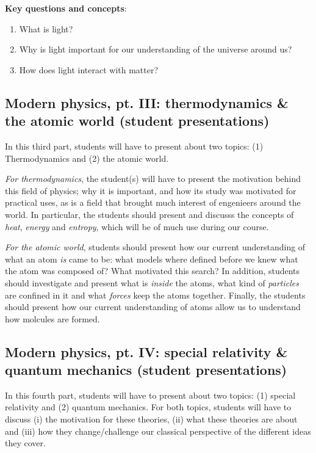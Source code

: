 \documentclass{tufte-handout}
\begin{document}
\begin{fullwidth}
\vspace{0.5 cm}
\noindent \textbf{Key questions and concepts}:
\begin{enumerate}
\item What is light?
\item Why is light important for our understanding of the universe around us?
\item How does light interact with matter?
\end{enumerate}

\subsection{Modern physics, pt. III: thermodynamics \& the atomic world (student presentations)}
In this third part, students will have to present about two topics: (1) Thermodynamics and (2) the atomic world.

\textit{For thermodynamics}, the student(s) will have to present the motivation behind this field of physics; why it is important, and how 
its study was motivated for practical uses, as is a field that brought much interest of engenieers around the world. In particular, 
the students should present and discusss the concepts of \textit{heat}, \textit{energy} and \textit{entropy}, which will be of much 
use during our course.

\textit{For the atomic world}, students should present how our current understanding of what an atom \textit{is} came to be: what models 
where defined before we knew what the atom was composed of? What motivated this search? In addition, students should investigate and 
present what is \textit{inside} the atoms, what kind of \textit{particles} are confined in it and what \textit{ forces} keep the atoms 
together. Finally, the students should present how our current understanding of atoms allow us to understand how molcules are formed. 

\subsection{Modern physics, pt. IV: special relativity \& quantum mechanics (student presentations)}
In this fourth part, students will have to present about two topics: (1) special relativity and (2) quantum mechanics. For both topics, 
students will have to discuss (i) the motivation for these theories, (ii) what these theories are about and (iii) how they change/challenge 
our classical perspective of the different ideas they cover. 


\end{fullwidth}
\end{document}
